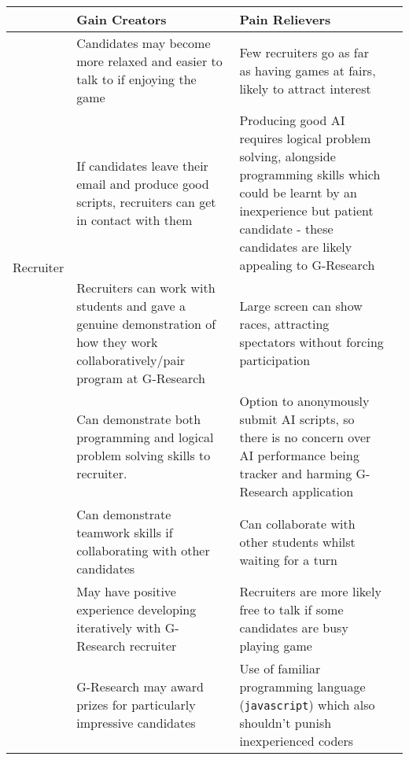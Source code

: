 \begin{adjustbox}{center}
	\begin{tabularx}{\textwidth}{| c | X | X | X |}
	\hline
	& Gain Creators & Pain Relievers \\ 
	\hline\hline
	\multirow{4}{*}{Recruiter} 
		       & Candidates may become more relaxed and easier to talk to if enjoying the game
		       & Few recruiters go as far as having games at fairs, likely to attract interest \\ \cline{2-3}

		       & If candidates leave their email and produce good scripts, recruiters can get in contact with them
		       & Producing good AI requires logical problem solving, alongside programming skills which could be learnt by an inexperience but patient candidate - these candidates are likely appealing to G-Research\\ \cline{2-3}
	
		       & Recruiters can work with students and gave a genuine demonstration of how they work collaboratively/pair program at G-Research
		       & Large screen can show races, attracting spectators without forcing participation\\ 
	\hline\hline
\multirow{4}{*}{Student} 
		       & Can demonstrate both programming and logical problem solving skills to recruiter.
		       & Option to anonymously submit AI scripts, so there is no concern over AI performance being tracker and harming G-Research application\\ \cline{2-3}

		       & Can demonstrate teamwork skills if collaborating with other candidates
		       & Can collaborate with other students whilst waiting for a turn\\ \cline{2-3}

		       & May have positive experience developing iteratively with G-Research recruiter
		       & Recruiters are more likely free to talk if some candidates are busy playing game\\ \cline{2-3}
		       
		       & G-Research may award prizes for particularly impressive candidates
		       & Use of familiar programming language ({\tt javascript}) which also shouldn't punish inexperienced coders\\ 
	\hline
	\end{tabularx}
\end{adjustbox}


